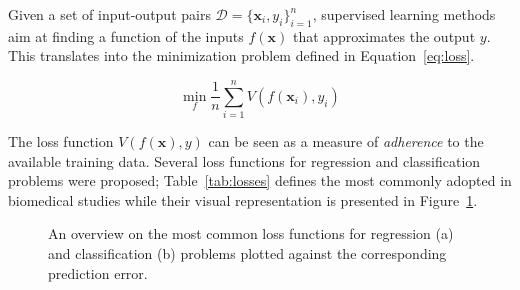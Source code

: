 
    Given a set of input-output pairs $\mathcal{D} = \{\bm{x}_i, y_i\}_{i=1}^n$, supervised learning methods aim at finding a function of the inputs $f(\bm{x})$ that approximates the output $y$. This translates into the minimization problem defined in Equation~\eqref{eq:loss}.

    \begin{equation}\label{eq:loss}
      \min_f \frac{1}{n}\sum_{i=1}^n V(f(\bm{x}_i),y_i) %
    \end{equation}

    The loss function $V(f(\bm{x}),y)$ can be seen as a measure of \textit{adherence} to the available training data. Several loss functions for regression and classification problems were proposed; Table~\ref{tab:losses} defines the most commonly adopted in biomedical studies while their visual representation is presented in Figure~\ref{fig:loss}. 
    
    \begin{figure}[!h]
    	\centering
    	\caption{An overview on the most common loss functions for regression (a) and classification (b) problems plotted against the corresponding prediction error.}\label{fig:loss}
    \end{figure}
    
